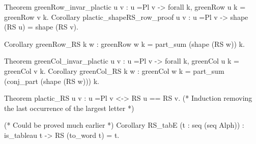 \documentclass[compress,11pt]{beamer}
\begin{document}
\begin{frame}[fragile]

  \begin{coqcode}
Theorem greenRow_invar_plactic u v :
  u =Pl v -> forall k, greenRow u k = greenRow v k.
Corollary plactic_shapeRS_row_proof u v : 
  u =Pl v -> shape (RS u) = shape (RS v).

Corollary greenRow_RS k w : greenRow w k = part_sum (shape (RS w)) k.

Theorem greenCol_invar_plactic u v : 
  u =Pl v -> forall k, greenCol u k = greenCol v k.
Corollary greenCol_RS k w : 
  greenCol w k = part_sum (conj_part (shape (RS w))) k.

Theorem plactic_RS u v : u =Pl v <-> RS u == RS v.
(* Induction removing the last occurrence of the largest letter *)


(* Could be proved much earlier *)
Corollary RS_tabE (t : seq (seq Alph)) : is_tableau t -> RS (to_word t) = t.
  \end{coqcode}
 
 
\end{frame}
\end{document}
